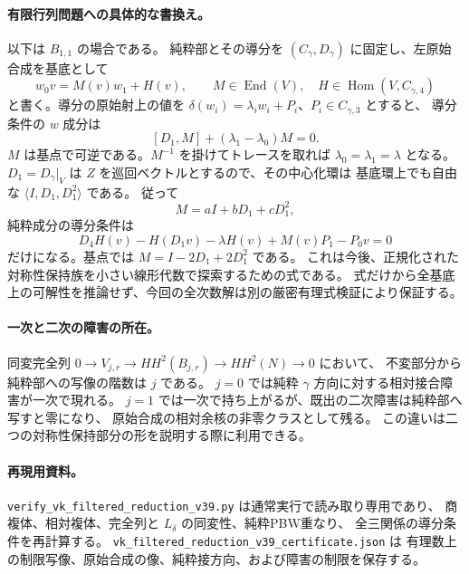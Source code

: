 \paragraph{有限行列問題への具体的な書換え。}
以下は $B_{1,1}$ の場合である。
純粋部とその導分を $(C_\gamma,D_\gamma)$ に固定し、左原始合成を基底として
\[
 w_0v=M(v)w_1+H(v),\qquad
 M\in\operatorname{End}(V),\quad H\in\operatorname{Hom}(V,C_{\gamma,4})
\]
と書く。導分の原始射上の値を
$\delta(w_i)=\lambda_iw_i+P_i$、$P_i\in C_{\gamma,3}$ とすると、
導分条件の $w$ 成分は
\[
 [D_1,M]+(\lambda_1-\lambda_0)M=0.
\]
$M$ は基点で可逆である。$M^{-1}$ を掛けてトレースを取れば
$\lambda_0=\lambda_1=\lambda$ となる。
$D_1=D_\gamma|_V$ は $Z$ を巡回ベクトルとするので、その中心化環は
基底環上でも自由な $\langle I,D_1,D_1^2\rangle$ である。
従って
\[
 M=aI+bD_1+cD_1^2,
\]
純粋成分の導分条件は
\[
 D_4H(v)-H(D_1v)-\lambda H(v)+M(v)P_1-P_0v=0
\]
だけになる。基点では $M=I-2D_1+2D_1^2$ である。
これは今後、正規化された対称性保持族を小さい線形代数で探索するための式である。
式だけから全基底上の可解性を推論せず、今回の全次数解は別の厳密有理式検証により保証する。

\paragraph{一次と二次の障害の所在。}
同変完全列
$0\to V_{j,r}\to HH^2(B_{j,r})\to HH^2(N)\to0$ において、
不変部分から純粋部への写像の階数は $j$ である。
$j=0$ では純粋 $\gamma$ 方向に対する相対接合障害が一次で現れる。
$j=1$ では一次で持ち上がるが、既出の二次障害は純粋部へ写すと零になり、
原始合成の相対余核の非零クラスとして残る。
この違いは二つの対称性保持部分の形を説明する際に利用できる。

\paragraph{再現用資料。}
\texttt{verify\_vk\_filtered\_reduction\_v39.py} は通常実行で読み取り専用であり、
商複体、相対複体、完全列と $L_\delta$ の同変性、純粋PBW重なり、
全三関係の導分条件を再計算する。
\texttt{vk\_filtered\_reduction\_v39\_certificate.json} は
有理数上の制限写像、原始合成の像、純粋接方向、および障害の制限を保存する。
